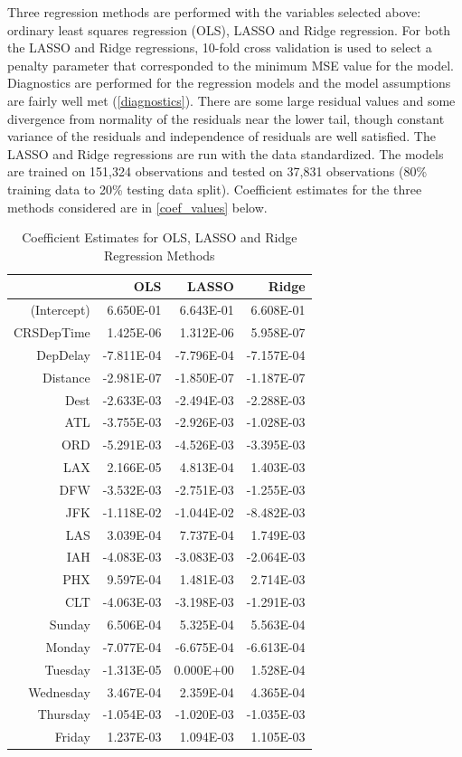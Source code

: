 \documentclass{article} %
\begin{document}
Three regression methods are performed with the variables selected above: ordinary least squares regression (OLS), LASSO and Ridge regression. For both the LASSO and Ridge regressions, 10-fold cross validation is used to select a penalty parameter that corresponded to the minimum MSE value for the model. Diagnostics are performed for the regression models and the model assumptions are fairly well met (\autoref{diagnostics}). There are some large residual values and some divergence from normality of the residuals near the lower tail, though constant variance of the residuals and independence of residuals are well satisfied. The LASSO and Ridge regressions are run with the data standardized. The models are trained on 151,324 observations and tested on 37,831 observations (80\% training data to 20\% testing data split). Coefficient estimates for the three methods considered are in \autoref{coef_values} below.
 
 \begin{table}[ht]
 
\centering
\begin{tabular}{rrrr}
  \hline
 & OLS & LASSO & Ridge  \\ 
  \hline
(Intercept) & 6.650E-01 & 6.643E-01 & 6.608E-01 \\ 
  CRSDepTime & 1.425E-06 & 1.312E-06 & 5.958E-07 \\ 
  DepDelay & -7.811E-04 & -7.796E-04 & -7.157E-04 \\ 
  Distance & -2.981E-07 & -1.850E-07 & -1.187E-07 \\ 
  Dest & -2.633E-03 & -2.494E-03 & -2.288E-03 \\ 
  ATL & -3.755E-03 & -2.926E-03 & -1.028E-03 \\ 
  ORD & -5.291E-03 & -4.526E-03 & -3.395E-03 \\ 
  LAX & 2.166E-05 & 4.813E-04 & 1.403E-03 \\ 
  DFW & -3.532E-03 & -2.751E-03 & -1.255E-03 \\ 
  JFK & -1.118E-02 & -1.044E-02 & -8.482E-03 \\ 
  LAS & 3.039E-04 & 7.737E-04 & 1.749E-03 \\ 
  IAH & -4.083E-03 & -3.083E-03 & -2.064E-03 \\ 
  PHX & 9.597E-04 & 1.481E-03 & 2.714E-03 \\ 
  CLT & -4.063E-03 & -3.198E-03 & -1.291E-03 \\ 
  Sunday & 6.506E-04 & 5.325E-04 & 5.563E-04 \\ 
  Monday & -7.077E-04 & -6.675E-04 & -6.613E-04 \\ 
  Tuesday & -1.313E-05 & 0.000E+00 & 1.528E-04 \\ 
  Wednesday & 3.467E-04 & 2.359E-04 & 4.365E-04 \\ 
  Thursday & -1.054E-03 & -1.020E-03 & -1.035E-03 \\ 
  Friday & 1.237E-03 & 1.094E-03 & 1.105E-03 \\ 
   \hline
\end{tabular}
\caption{Coefficient Estimates for OLS, LASSO and Ridge Regression Methods\label{coef_values}} 

\end{table}
 
\end{document}
